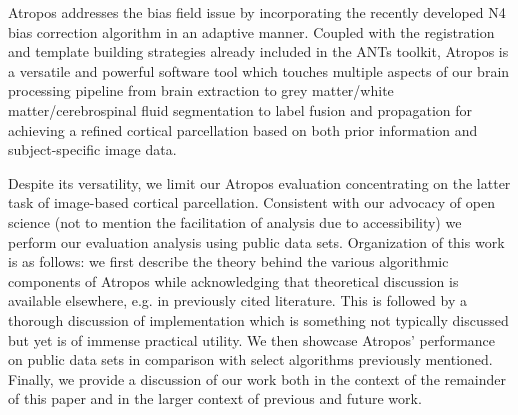 \documentclass[11pt,english]{article}
\begin{document}
Atropos addresses the bias field issue by incorporating the recently developed N4 bias correction algorithm \citep{Tustison2010} in an adaptive manner.  Coupled with the registration \citep{Avants2010b} and template building strategies \citep{Avants2010} already included in the ANTs toolkit,   
Atropos is a versatile and powerful software tool which touches multiple aspects of our brain processing pipeline from brain extraction \citep{Avants2010a} to grey matter/white matter/cerebrospinal fluid segmentation to label fusion and propagation for achieving a refined cortical parcellation based on both prior information and subject-specific image data.  

Despite its versatility, we limit our Atropos evaluation concentrating on the latter task of image-based cortical parcellation.  Consistent with our advocacy of open science (not to mention the facilitation of analysis due to accessibility) we perform our evaluation analysis using public data sets.  Organization of this work is as follows:  we first describe the theory behind the various algorithmic components of Atropos while acknowledging that theoretical discussion is available elsewhere, e.g. in previously cited literature.  This is followed by a thorough discussion of implementation which is something not typically discussed but yet is of immense practical utility.  We then showcase Atropos' performance on public data sets in comparison with select algorithms previously mentioned.  Finally, we provide a discussion of our work both in the context of the remainder of this paper and in the larger context of previous and future work.






\end{document}
